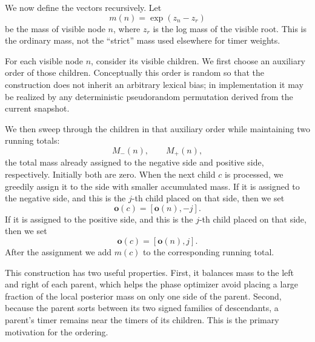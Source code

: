 We now define the vectors recursively. Let
\[
m(n) = \exp(z_n - z_r)
\]
be the mass of visible node $n$, where $z_r$ is the log mass of the visible root.
This is the ordinary mass, not the ``strict'' mass used elsewhere for timer
weights.

For each visible node $n$, consider its visible children. We first choose an
auxiliary order of those children. Conceptually this order is random so that the
construction does not inherit an arbitrary lexical bias; in implementation it may
be realized by any deterministic pseudorandom permutation derived from the
current snapshot.

We then sweep through the children in that auxiliary order while maintaining two
running totals:
\[
M_-(n), \qquad M_+(n),
\]
the total mass already assigned to the negative side and positive side,
respectively. Initially both are zero. When the next child $c$ is processed, we
greedily assign it to the side with smaller accumulated mass. If it is assigned
to the negative side, and this is the $j$-th child placed on that side, then we
set
\[
\mathbf{o}(c) = [\mathbf{o}(n), -j].
\]
If it is assigned to the positive side, and this is the $j$-th child placed on
that side, then we set
\[
\mathbf{o}(c) = [\mathbf{o}(n), j].
\]
After the assignment we add $m(c)$ to the corresponding running total.

This construction has two useful properties. First, it balances mass to the left
and right of each parent, which helps the phase optimizer avoid placing a large
fraction of the local posterior mass on only one side of the parent. Second,
because the parent sorts between its two signed families of descendants, a
parent's timer remains near the timers of its children. This is the primary
motivation for the ordering.
